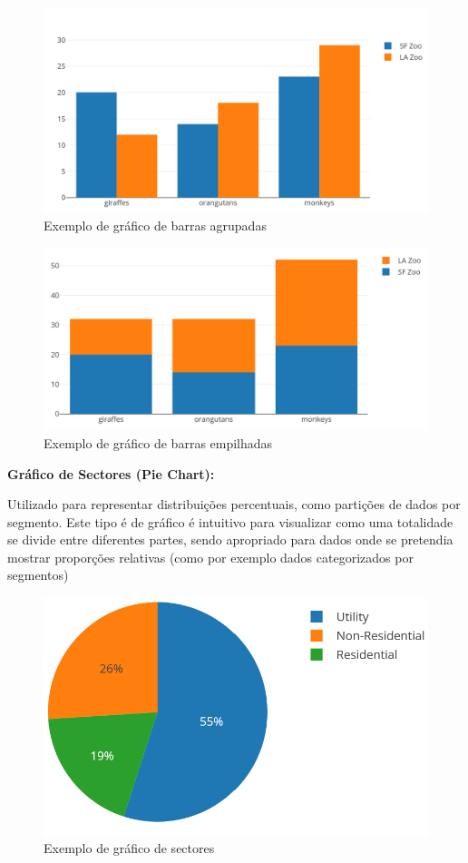 \begin{figure}[H]
\centering
\includegraphics[max width=12cm, keepaspectratio]{./img/agrupada}
\caption{Exemplo de gráfico de barras agrupadas}
\end{figure}
\noindent

\begin{figure}[H]
\centering
\includegraphics[max width=12cm, keepaspectratio]{./img/empilhada}
\caption{Exemplo de gráfico de barras empilhadas}
\end{figure}
\noindent

\textbf{Gráfico de Sectores (Pie Chart):}  

Utilizado para representar distribuições percentuais, como partições de dados por segmento. Este tipo é de gráfico é intuitivo para visualizar como uma totalidade se divide entre diferentes partes, sendo apropriado para dados onde se pretendia mostrar proporções relativas (como por exemplo dados categorizados por segmentos)

\begin{figure}[H]
    \centering
    \includegraphics[max width=12cm, keepaspectratio]{./img/pie}
    \caption{Exemplo de gráfico de sectores}
\end{figure}
\noindent

